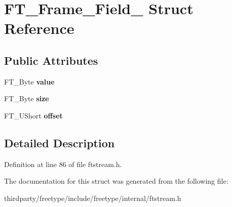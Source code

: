 \hypertarget{struct_f_t___frame___field__}{}\section{F\+T\+\_\+\+Frame\+\_\+\+Field\+\_\+ Struct Reference}
\label{struct_f_t___frame___field__}
\subsection*{Public Attributes}
\begin{DoxyCompactItemize}
\item 
\mbox{\label{struct_f_t___frame___field___a10f91dcdd0a582727b67ad45d42bab41}} 
F\+T\+\_\+\+Byte {\bfseries value}
\item 
\mbox{\label{struct_f_t___frame___field___a47e6fbcb90c079421d9d9b64f63a587e}} 
F\+T\+\_\+\+Byte {\bfseries size}
\item 
\mbox{\label{struct_f_t___frame___field___a85c3275fbb7044f7d6880020b6f0f794}} 
F\+T\+\_\+\+U\+Short {\bfseries offset}
\end{DoxyCompactItemize}


\subsection{Detailed Description}


Definition at line 86 of file ftstream.\+h.



The documentation for this struct was generated from the following file\+:\begin{DoxyCompactItemize}
\item 
thirdparty/freetype/include/freetype/internal/ftstream.\+h\end{DoxyCompactItemize}
